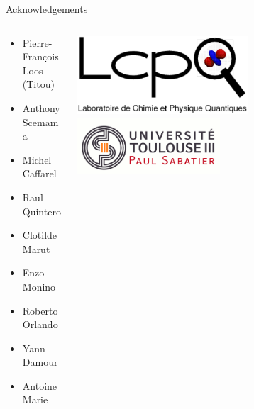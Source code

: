 \documentclass[aspectratio=169,9pt]{beamer}
\begin{document}
\begin{frame}{Acknowledgements}
        \begin{columns}
                \begin{column}{0.6\textwidth}
                        \begin{itemize}
				\item Pierre-François Loos (Titou)
				\vspace{0.1cm}
				\item Anthony Scemama
				\vspace{0.1cm}
				\item Michel Caffarel
				\vspace{0.1cm}
                                \item Raul Quintero 
				\vspace{0.1cm}
                                \item Clotilde Marut 
				\vspace{0.1cm}
                                \item Enzo Monino 
				\vspace{0.1cm}
                                \item Roberto Orlando 
				\vspace{0.1cm}
                                \item Yann Damour 
				\vspace{0.1cm}
                                \item Antoine Marie 
                        \end{itemize}
                \end{column}
                \begin{column}{0.32\textwidth}
                        \begin{center}
                                \includegraphics[width=0.6\textwidth]{fig/LCPQ}
                                \\
                                \includegraphics[width=0.5\textwidth]{fig/UPS}

\end{center}
\end{column}
\end{columns}
\end{frame}
\end{document}
